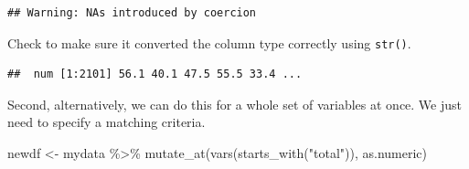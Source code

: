 \documentclass[
]{book}
\newenvironment{Shaded}{\begin{snugshade}}{\end{snugshade}}
\newcommand{\FunctionTok}[1]{\textcolor[rgb]{0.00,0.00,0.00}{#1}}
\newcommand{\NormalTok}[1]{#1}
\newcommand{\OtherTok}[1]{\textcolor[rgb]{0.56,0.35,0.01}{#1}}
\newcommand{\SpecialCharTok}[1]{\textcolor[rgb]{0.00,0.00,0.00}{#1}}
\newcommand{\StringTok}[1]{\textcolor[rgb]{0.31,0.60,0.02}{#1}}
\begin{document}
\begin{verbatim}
## Warning: NAs introduced by coercion
\end{verbatim}

Check to make sure it converted the column type correctly using \texttt{str()}.

\begin{Shaded}
\end{Shaded}

\begin{verbatim}
##  num [1:2101] 56.1 40.1 47.5 55.5 33.4 ...
\end{verbatim}

Second, alternatively, we can do this for a whole set of variables at once. We just need to specify a matching criteria.

\begin{Shaded}
\begin{Highlighting}[]
\NormalTok{newdf }\OtherTok{\textless{}{-}}\NormalTok{ mydata }\SpecialCharTok{\%\textgreater{}\%} 
  \FunctionTok{mutate\_at}\NormalTok{(}\FunctionTok{vars}\NormalTok{(}\FunctionTok{starts\_with}\NormalTok{(}\StringTok{"total"}\NormalTok{)), as.numeric)}
\end{Highlighting}
\end{Shaded}
\end{document}
